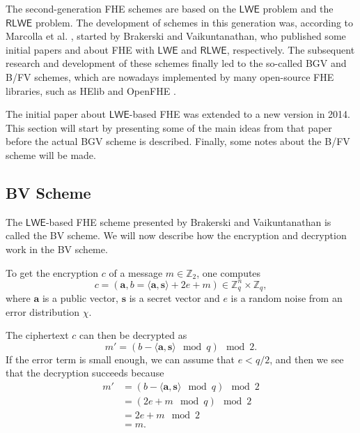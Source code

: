 The second-generation FHE schemes are based on the $\mathsf{LWE}$ problem and the $\mathsf{RLWE}$ problem. The development of schemes in this generation was, according to Marcolla et al. \cite{cite:QianFHE}, started by Brakerski and Vaikuntanathan, who published some initial papers \cite{cite:bv_lwe} and \cite{cite:bv_rlwe} about FHE with $\mathsf{LWE}$ and $\mathsf{RLWE}$, respectively. The subsequent research and development of these schemes finally led to the so-called BGV and B/FV schemes, which are nowadays implemented by many open-source FHE libraries, such as HElib \cite{cite:HElib} and OpenFHE \cite{cite:openFHE}.

The initial paper \cite{cite:bv_lwe} about $\mathsf{LWE}$-based FHE was extended to a new version \cite{cite:bv_lwe_2014} in 2014. This section will start by presenting some of the main ideas from that paper before the actual BGV scheme is described. Finally, some notes about the B/FV scheme will be made.



\subsection{BV Scheme}\label{sec:bv}

The $\mathsf{LWE}$-based FHE scheme presented by Brakerski and Vaikuntanathan \cite{cite:bv_lwe_2014} is called the BV scheme. We will now describe how the encryption and decryption work in the BV scheme. %

To get the encryption $c$ of a message $m \in \mathbb{Z}_2$, one computes
$$c = (\mathbf{a}, b = \langle \mathbf{a}, \mathbf{s} \rangle +2e + m) \in \mathbb{Z}_q^n \times \mathbb{Z}_q,$$
where $\mathbf{a}$ is a public vector, $\mathbf{s}$ is a secret vector and $e$ is a random noise from an error distribution $\chi$.

The ciphertext $c$ can then be decrypted as 
$$m' = (b - \langle \mathbf{a}, \mathbf{s} \rangle \mod{q}) \mod{2}.$$
If the error term is small enough, we can assume that $e < q/2$, and then we see that the decryption succeeds because
\begin{align*}
m' &= (b - \langle \mathbf{a}, \mathbf{s} \rangle \mod{q}) \mod{2} \\
&= (2e + m \mod{q}) \mod{2} \\
&= 2e + m \mod 2 \\
&= m.
\end{align*}

